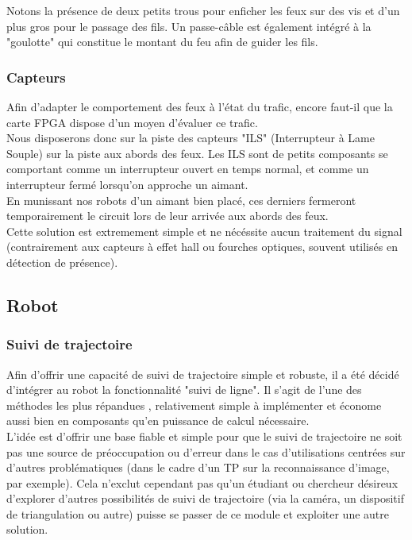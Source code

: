 		\vspace{15pt}

		Notons la présence de deux petits trous pour enficher les feux sur des vis et d'un plus gros pour le passage des fils. Un passe-câble est également intégré à la "goulotte" qui constitue le montant du feu afin de guider les fils.

	\subsubsection{Capteurs}

		Afin d'adapter le comportement des feux à l'état du trafic, encore faut-il que la carte FPGA dispose d'un moyen d'évaluer ce trafic.\\

		Nous disposerons donc sur la piste des capteurs "ILS" (Interrupteur à Lame Souple)  sur la piste aux abords des feux. Les ILS sont de petits composants se comportant comme un interrupteur ouvert en temps normal, et comme un interrupteur fermé lorsqu'on approche un aimant.\\

		En munissant nos robots d'un aimant bien placé, ces derniers fermeront temporairement le circuit lors de leur arrivée aux abords des feux.\\

		Cette solution est extremement simple et ne nécéssite aucun traitement du signal (contrairement aux capteurs à effet hall ou fourches optiques, souvent utilisés en détection de présence).

\newpage
\subsection{Robot}

	\subsubsection{Suivi de trajectoire}

		Afin d’offrir une capacité de suivi de trajectoire simple et robuste, il a été décidé d’intégrer au robot la fonctionnalité "suivi de ligne". Il s’agit de l’une des méthodes les plus répandues\cite{bib3} \cite{bib4}, relativement simple à implémenter et économe aussi bien en composants qu’en puissance de calcul nécessaire.\\

		L’idée est d’offrir une base fiable et simple pour que le suivi de trajectoire ne soit pas une source de préoccupation ou d’erreur dans le cas d'utilisations centrées sur d’autres problématiques (dans le cadre d'un TP sur la reconnaissance d'image, par exemple). Cela n’exclut cependant pas qu’un étudiant ou chercheur désireux d’explorer d’autres possibilités de suivi de trajectoire (via la caméra, un dispositif de triangulation ou autre) puisse se passer de ce module et exploiter une autre solution.\\

